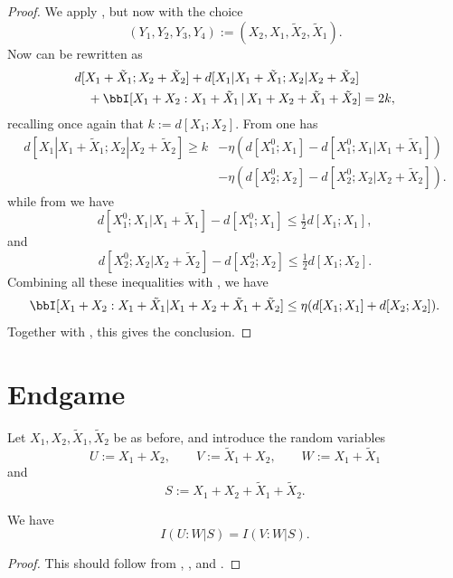 \begin{proof}
  \leanok
  We apply , but now with the choice
  \[
    (Y_1,Y_2,Y_3,Y_4) := (X_2, X_1, \tilde X_2, \tilde X_1).
  \]
  Now  can be rewritten as
  \begin{align*}
    &d[X_1+\tilde X_1;X_2+\tilde X_2] + d[X_1|X_1+\tilde X_1; X_2|X_2+\tilde X_2] \\
    &\quad + \bbI[X_1+X_2 : X_1 + \tilde X_1 \,|\, X_1+X_2+\tilde X_1+\tilde X_2] = 2k,
  \end{align*}
  recalling once again that $k := d[X_1;X_2]$.  From  one has
  \begin{align*}
    d[X_1|X_1+\tilde X_1; X_2|X_2+\tilde X_2]   \geq k &- \eta (d[X^0_1;X_1] - d[X^0_1;X_1|X_1+\tilde X_1]) \\& - \eta (d[X^0_2;X_2] - d[X^0_2;X_2|X_2+\tilde X_2]) .
  \end{align*}
  while from  we have
  \[
    d[X^0_1;X_1|X_1+\tilde X_1] -  d[X^0_1;X_1] \leq  \tfrac{1}{2} d[X_1;X_1],
  \]
  and
  \[
    d[X^0_2;X_2|X_2+\tilde X_2] -  d[X^0_2;X_2] \leq \tfrac{1}{2} d[X_1;X_2].
    \]
  Combining all these inequalities with , we have
  \begin{equation}\label{combined}
  \bbI[X_1+X_2 : X_1 + \tilde X_1 | X_1+X_2+\tilde X_1+\tilde X_2] \leq \eta ( d[X_1; X_1] + d[X_2; X_2] ).
  \end{equation}
  Together with , this gives the conclusion.
\end{proof}


\section{Endgame}

Let $X_1,X_2,\tilde X_1,\tilde X_2$ be as before, and introduce the random variables
\[U := X_1 + X_2, \qquad V := \tilde X_1 + X_2, \qquad W := X_1 + \tilde X_1\] and
\[  S := X_1 + X_2 + \tilde X_1 + \tilde X_2.\]

\begin{lemma}\label{symm-lemma}
  \leanok
We have
$$ I(U:W | S) = I(V:W | S).$$
\end{lemma}

\begin{proof}\leanok
This should follow from , , and .
\end{proof}

